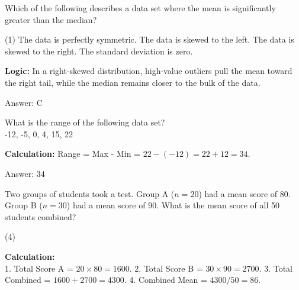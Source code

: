 \documentclass[11pt,paper=a4,answers]{exam}
\begin{document}
\begin{questions}
\vspace{60pt}

\question
Which of the following describes a data set where the mean is significantly greater than the median?
\begin{tasks}(1)
    \task The data is perfectly symmetric.
    \task The data is skewed to the left.
    \task The data is skewed to the right.
    \task The standard deviation is zero.
\end{tasks}

\begin{solution}
\textbf{Logic:} In a right-skewed distribution, high-value outliers pull the mean toward the right tail, while the median remains closer to the bulk of the data.

\vspace{30pt}

Answer: \colorbox{yellow!100}{C}
\end{solution}

\vspace{60pt}

\question
What is the range of the following data set? \\
-12, -5, 0, 4, 15, 22

\begin{solution}
\textbf{Calculation:} Range = Max - Min = $22 - (-12) = 22 + 12 = 34$.

\vspace{30pt}

Answer: \colorbox{yellow!100}{34}
\end{solution}

\vspace{60pt}

\question
Two groups of students took a test. Group A ($n=20$) had a mean score of 80. Group B ($n=30$) had a mean score of 90. What is the mean score of all 50 students combined?
\begin{tasks}(4)
\end{tasks}

\begin{solution}
\textbf{Calculation:} \\
1. Total Score A = $20 \times 80 = 1600$.
2. Total Score B = $30 \times 90 = 2700$.
3. Total Combined = $1600 + 2700 = 4300$.
4. Combined Mean = $4300 / 50 = 86$.


\end{solution}
\end{questions}
\end{document}
